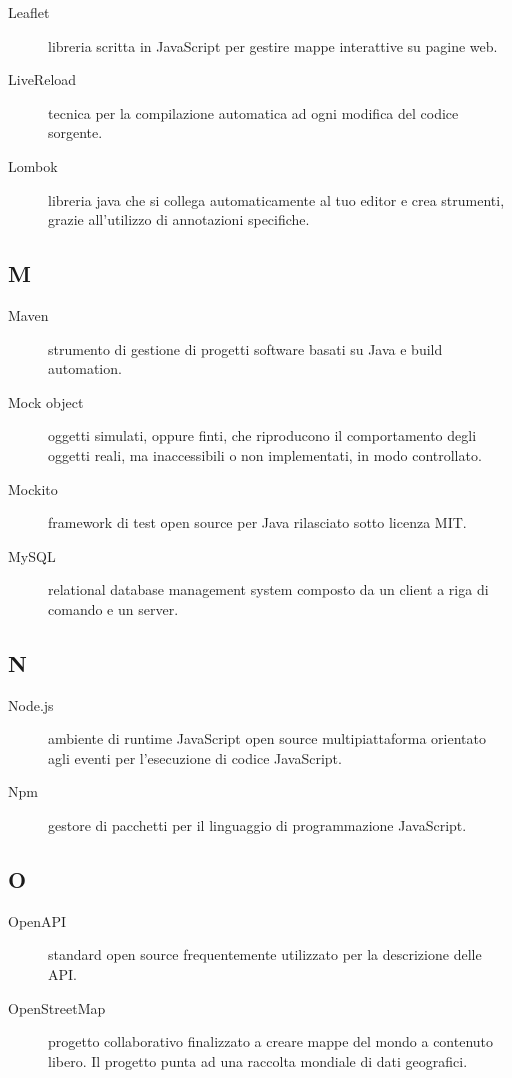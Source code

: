 \documentclass[../manuale-manutentore.tex]{subfiles}
\begin{document}
\begin{description}
    \item[Leaflet] libreria scritta in JavaScript per gestire mappe interattive su pagine web.
    \item[LiveReload] tecnica per la compilazione automatica ad ogni modifica del codice sorgente.
    \item[Lombok] libreria java che si collega automaticamente al tuo editor e crea strumenti, grazie all'utilizzo di annotazioni specifiche.
\end{description}

\subsection{M}

\begin{description}
    \item[Maven] strumento di gestione di progetti software basati su Java e build automation.
    \item[Mock object] oggetti simulati, oppure finti, che riproducono il comportamento degli oggetti reali, ma inaccessibili o non implementati, in modo controllato.
    \item[Mockito] framework di test open source per Java rilasciato sotto licenza MIT\@.
    \item[MySQL] relational database management system composto da un client a riga di comando e un server.
\end{description}

\subsection{N}

\begin{description}
  \item[Node.js] ambiente di runtime JavaScript open source multipiattaforma orientato agli eventi per l'esecuzione di codice JavaScript.
  \item[Npm] gestore di pacchetti per il linguaggio di programmazione JavaScript.
\end{description}

\subsection{O}

\begin{description}
    \item[OpenAPI] standard open source frequentemente utilizzato per la descrizione delle API\@.
    \item[OpenStreetMap] progetto collaborativo finalizzato a creare mappe del mondo a contenuto libero. Il progetto punta ad una raccolta mondiale di dati geografici.
\end{description}
\end{document}
